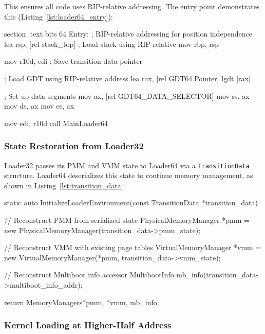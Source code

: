 \documentclass[a4paper,10pt,twoside]{report}
\theoremstyle{definition}
\begin{document}
This ensures all code uses RIP-relative addressing. The entry point demonstrates this (Listing~\ref{lst:loader64_entry}):

\begin{nasmcode}[caption={Loader64 Entry Point with RIP-Relative Addressing (entry.nasm)}, label={lst:loader64_entry}]
section .text
bits 64
Entry:
    ; RIP-relative addressing for position independence
    lea rsp, [rel stack_top]    ; Load stack using RIP-relative
    mov rbp, rsp
    
    mov r10d, edi               ; Save transition data pointer
    
    ; Load GDT using RIP-relative address
    lea rax, [rel GDT64.Pointer]
    lgdt [rax]
    
    ; Set up data segments
    mov ax, [rel GDT64_DATA_SELECTOR]
    mov ss, ax
    mov ds, ax
    mov es, ax
    
    mov edi, r10d
    call MainLoader64
\end{nasmcode}

\clearpage

\subsubsection{State Restoration from Loader32}

Loader32 passes its PMM and VMM state to Loader64 via a \texttt{TransitionData} structure. Loader64 deserializes this state to continue memory management, as shown in Listing~\ref{lst:transition_data}:

\begin{cppcode}[caption={TransitionData Deserialization (main.cpp)}, label={lst:transition_data}]
static auto InitializeLoaderEnvironment(const TransitionData *transition_data) {
    // Reconstruct PMM from serialized state
    PhysicalMemoryManager *pmm = 
        new PhysicalMemoryManager(transition_data->pmm_state);
    
    // Reconstruct VMM with existing page tables
    VirtualMemoryManager *vmm = 
        new VirtualMemoryManager(*pmm, transition_data->vmm_state);
    
    // Reconstruct Multiboot info accessor
    MultibootInfo mb_info(transition_data->multiboot_info_addr);
    
    return {MemoryManagers{*pmm, *vmm}, mb_info};
}
\end{cppcode}

\subsubsection{Kernel Loading at Higher-Half Address}
\end{document}
